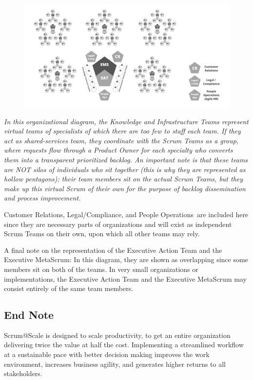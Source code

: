 \documentclass[12pt,a4paper,parskip=full]{scrartcl}
\begin{document}
\begin{figure}
    \centering
    \includegraphics[scale=0.15]{6.png}
\end{figure}


\emph{In this organizational diagram, the Knowledge and Infrastructure
Teams represent virtual teams of specialists of which there are too few
to staff each team. If they act as shared-services team, they coordinate
with the Scrum Teams as a group, where requests flow through a Product
Owner for each specialty who converts them into a transparent
prioritized backlog. An important note is that these teams are NOT silos
of individuals who sit together (this is why they are represented as
hollow pentagons); their team members sit on the actual Scrum Teams, but
they make up this virtual Scrum of their own for the purpose of backlog
dissemination and process improvement.}

Customer Relations, Legal/Compliance, and People Operations~are included
here since they are necessary parts of organizations and will exist as
independent Scrum Teams on their own, upon which all other teams may
rely.

A final note on the representation of the Executive Action Team and the
Executive MetaScrum: In this diagram, they are shown as overlapping
since some members sit on both of the teams. In very small organizations
or implementations, the Executive Action Team and the Executive
MetaScrum may consist entirely of the same team members.

\subsection{End Note}\label{End-Note}

Scrum@Scale is designed to scale productivity, to get an entire
organization delivering twice the value at half the cost. Implementing a
streamlined workflow at a sustainable pace with better decision making
improves the work environment, increases business agility, and generates
higher returns to all stakeholders.
\end{document}
